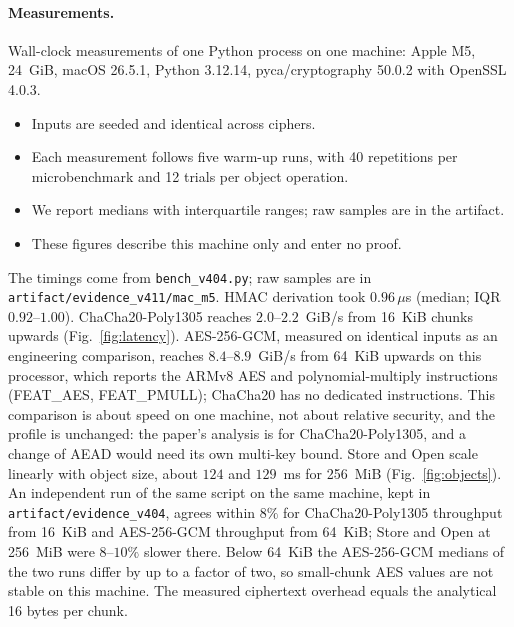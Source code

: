 \documentclass[pdflatex,sn-mathphys-num]{sn-jnl}
\newcommand{\code}[1]{\texttt{#1}}
\newcommand{\fpath}[1]{\nolinkurl{#1}}%
\begin{document}
\paragraph{Measurements.}
Wall-clock measurements of one Python process on one machine: Apple M5, 24~GiB, macOS 26.5.1, Python 3.12.14, pyca/cryptography 50.0.2 with OpenSSL 4.0.3.
\begin{itemize}
\item Inputs are seeded and identical across ciphers.
\item Each measurement follows five warm-up runs, with 40 repetitions per microbenchmark and 12 trials per object operation.
\item We report medians with interquartile ranges; raw samples are in the artifact.
\item These figures describe this machine only and enter no proof.
\end{itemize}
The timings come from \fpath{bench_v404.py}; raw samples are in \fpath{artifact/evidence_v411/mac_m5}. HMAC derivation took $0.96\,\mu$s (median; IQR $0.92$--$1.00$). ChaCha20-Poly1305 reaches $2.0$--$2.2$~GiB/s from 16~KiB chunks upwards (Fig.~\ref{fig:latency}). AES-256-GCM, measured on identical inputs as an engineering comparison, reaches $8.4$--$8.9$~GiB/s from 64~KiB upwards on this processor, which reports the ARMv8 AES and polynomial-multiply instructions (FEAT\_AES, FEAT\_PMULL); ChaCha20 has no dedicated instructions. This comparison is about speed on one machine, not about relative security, and the profile is unchanged: the paper's analysis is for ChaCha20-Poly1305, and a change of AEAD would need its own multi-key bound. Store and Open scale linearly with object size, about $124$ and $129$~ms for 256~MiB (Fig.~\ref{fig:objects}). An independent run of the same script on the same machine, kept in \code{artifact/evidence\_v404}, agrees within $8\%$ for ChaCha20-Poly1305 throughput from 16~KiB and AES-256-GCM throughput from 64~KiB; Store and Open at 256~MiB were $8$--$10\%$ slower there. Below 64~KiB the AES-256-GCM medians of the two runs differ by up to a factor of two, so small-chunk AES values are not stable on this machine. The measured ciphertext overhead equals the analytical 16 bytes per chunk.
\end{document}

